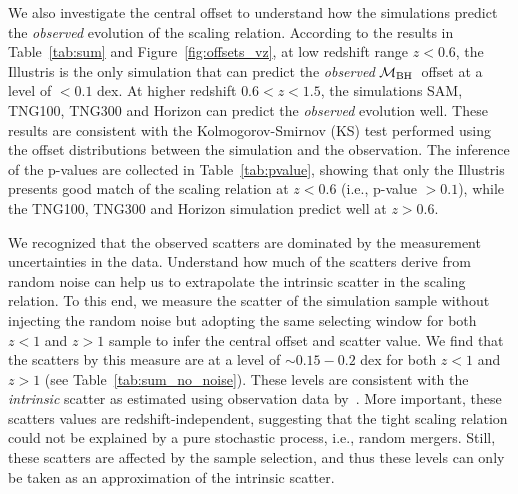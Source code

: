 \documentclass[twocolumn]{aastex631}
\def\smass{{$M_*$}}
\def\mbh{$\mathcal M_{\rm BH}$}
\begin{document}
We also investigate the central offset to understand how the simulations predict the {\it observed} evolution of the scaling relation. According to the results in Table~\ref{tab:sum} and Figure~\ref{fig:offsets_vz}, at low redshift range $z<0.6$, the Illustris is the only simulation that can predict the {\it observed} \mbh\ offset at a level of $<0.1$ dex. At higher redshift $0.6<z<1.5$, the simulations SAM, TNG100, TNG300 and Horizon can predict the {\it observed} evolution well. These results are consistent with the Kolmogorov-Smirnov (KS) test performed using the offset distributions between the simulation and the observation. The inference of the p-values are collected in Table~\ref{tab:pvalue}, showing that only the Illustris presents good match of the scaling relation at $z<0.6$ (i.e., p-value $> 0.1$), while the TNG100, TNG300 and Horizon simulation predict well at $z>0.6$. 

We recognized that the observed scatters are dominated by the measurement uncertainties in the data. Understand how much of the scatters derive from random noise can help us to extrapolate the intrinsic scatter in the scaling relation. To this end, we measure the scatter of the simulation sample without injecting the random noise but adopting the same selecting window for both $z<1$ and $z>1$ sample to infer the central offset and scatter value. We find that the scatters by this measure are at a level of $\sim0.15-0.2$ dex for both $z<1$ and $z>1$ (see Table~\ref{tab:sum_no_noise}). These levels are consistent with the {\it intrinsic} scatter as estimated using observation data by~\citet{Ding2020, 2021arXiv210902751L}. More important, these scatters values are redshift-independent, suggesting that the tight scaling relation could not be explained by a pure stochastic process, i.e., random mergers. Still, these scatters are affected by the sample selection, and thus these levels can only be taken as an approximation of the intrinsic scatter.

\end{document}
